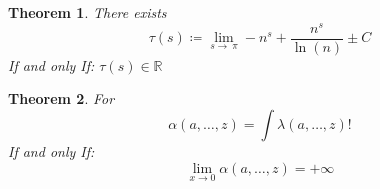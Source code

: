 \documentclass[10pt, twocolumn]{article}
\theoremstyle{plain}
\newtheorem{theorem}{Theorem}[section]
\theoremstyle{definition}
\theoremstyle{remark}
\begin{document}
\begin{theorem}
  There exists
  \begin{equation}
    \tau (s) \coloneq \lim _{s\to \:\pi } -n^s+\frac{n^s}{\ln \left(n\right)}\pm C
  \end{equation}
  If and only If: $\tau (s) \in \mathbb{R}$
\end{theorem}

\begin{theorem}
  For
  \begin{equation}
    \alpha(a, \dots, z) = \int \lambda(a, \dots, z)! 
  \end{equation}
  If and only If:
  \begin{equation}
    \lim_{x \to 0} \alpha(a, \dots, z) = +\infty
  \end{equation}
\end{theorem}
\end{document}
